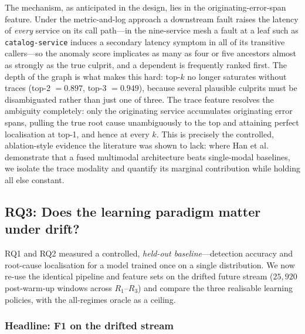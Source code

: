 \documentclass[pdflatex,sn-mathphys-num]{sn-jnl}%
\theoremstyle{thmstyleone}%
\theoremstyle{thmstyletwo}%
\theoremstyle{thmstylethree}%
\begin{document}
The mechanism, as anticipated in the design, lies in the originating-error-span feature. Under the metric-and-log approach a downstream fault raises the latency of \emph{every} service on its call path---in the nine-service mesh a fault at a leaf such as \texttt{catalog-service} induces a secondary latency symptom in all of its transitive callers---so the anomaly score implicates as many as four or five ancestors almost as strongly as the true culprit, and a dependent is frequently ranked first. The depth of the graph is what makes this hard: top-$k$ no longer saturates without traces (top-2 $=0.897$, top-3 $=0.949$), because several plausible culprits must be disambiguated rather than just one of three. The trace feature resolves the ambiguity completely: only the originating service accumulates originating error spans, pulling the true root cause unambiguously to the top and attaining perfect localisation at top-1, and hence at every $k$. This is precisely the controlled, ablation-style evidence the literature was shown to lack: where Han et al.\ \cite{han2024} demonstrate that a fused multimodal architecture beats single-modal baselines, we isolate the trace modality and quantify its marginal contribution while holding all else constant.

\subsection{RQ3: Does the learning paradigm matter under drift?}\label{sec:res-rq3}

RQ1 and RQ2 measured a controlled, \emph{held-out baseline}---detection accuracy and root-cause localisation for a model trained once on a single distribution. We now re-use the identical pipeline and feature sets on the drifted future stream ($25{,}920$ post-warm-up windows across $R_1$--$R_3$) and compare the three realisable learning policies, with the all-regimes oracle as a ceiling.

\subsubsection{Headline: F1 on the drifted stream}\label{sec:res-rq3-head}
\end{document}
